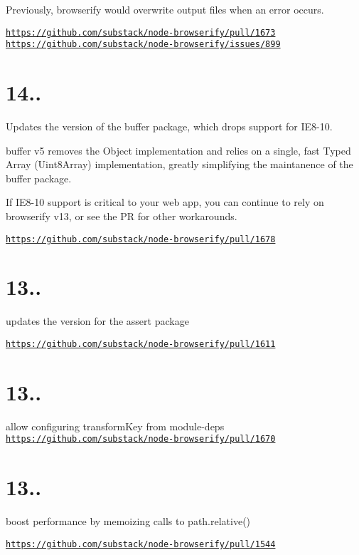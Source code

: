 Previously, browserify would overwrite output files when an error occurs.

\href{https://github.com/substack/node-browserify/pull/1673}{\tt https\+://github.\+com/substack/node-\/browserify/pull/1673} \href{https://github.com/substack/node-browserify/issues/899}{\tt https\+://github.\+com/substack/node-\/browserify/issues/899}

\section*{14..}

Updates the version of the buffer package, which drops support for I\+E8-\/10.

buffer v5 removes the {\ttfamily Object} implementation and relies on a single, fast Typed Array ({\ttfamily Uint8\+Array}) implementation, greatly simplifying the maintanence of the buffer package.

If I\+E8-\/10 support is critical to your web app, you can continue to rely on browserify v13, or see the PR for other workarounds.

\href{https://github.com/substack/node-browserify/pull/1678}{\tt https\+://github.\+com/substack/node-\/browserify/pull/1678}

\section*{13..}

updates the version for the assert package

\href{https://github.com/substack/node-browserify/pull/1611}{\tt https\+://github.\+com/substack/node-\/browserify/pull/1611}

\section*{13..}

allow configuring transform\+Key from module-\/deps \href{https://github.com/substack/node-browserify/pull/1670}{\tt https\+://github.\+com/substack/node-\/browserify/pull/1670}

\section*{13..}

boost performance by memoizing calls to path.\+relative()

\href{https://github.com/substack/node-browserify/pull/1544}{\tt https\+://github.\+com/substack/node-\/browserify/pull/1544}

